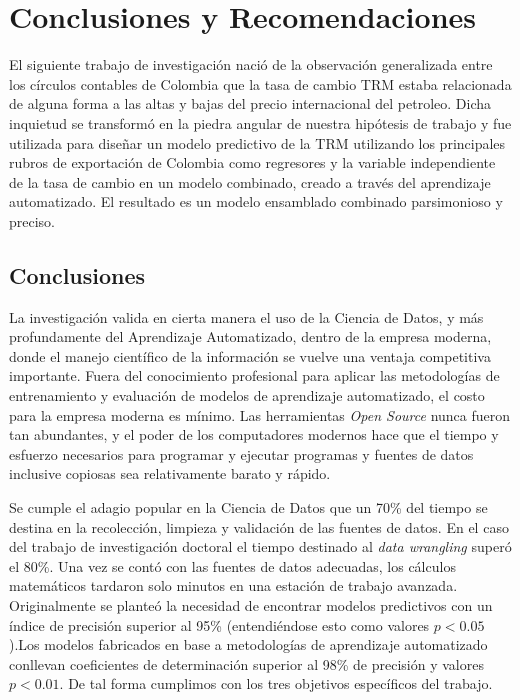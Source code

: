 \setcounter{chapter}{4}
\chapter{Conclusiones y Recomendaciones}
El siguiente trabajo de investigación nació de la observación generalizada entre los círculos contables de Colombia que la tasa de cambio TRM estaba relacionada de alguna forma a las altas y bajas del precio internacional del petroleo. Dicha inquietud se transformó en la piedra angular de nuestra hipótesis de trabajo y fue utilizada para diseñar un modelo predictivo de la TRM utilizando los principales rubros de exportación de Colombia como regresores y la variable independiente de la tasa de cambio en un modelo combinado, creado a través del aprendizaje automatizado. El resultado es un modelo ensamblado combinado parsimonioso y preciso.

\section{Conclusiones}
La investigación valida en cierta manera el uso de la Ciencia de Datos, y más profundamente del Aprendizaje Automatizado, dentro de la empresa moderna, donde el manejo científico de la información se vuelve una ventaja competitiva importante. Fuera del conocimiento profesional para aplicar las metodologías de entrenamiento y evaluación de modelos de aprendizaje automatizado, el costo para la empresa moderna es mínimo. Las herramientas \emph{Open Source} nunca fueron tan abundantes, y el poder de los computadores modernos hace que el tiempo y esfuerzo necesarios para programar y ejecutar programas y fuentes de datos inclusive copiosas sea relativamente barato y rápido.

Se cumple el adagio popular en la Ciencia de Datos que un 70\% del tiempo se destina en la recolección, limpieza y validación de las fuentes de datos. En el caso del trabajo de investigación doctoral el tiempo destinado al \emph{data wrangling} superó el 80\%. Una vez se contó con las fuentes de datos adecuadas, los cálculos matemáticos tardaron solo minutos en una estación de trabajo avanzada. Originalmente se planteó la necesidad de encontrar modelos predictivos con un índice de precisión superior al 95\% (entendiéndose esto como valores $p < 0.05$).Los modelos fabricados en base a metodologías de aprendizaje automatizado conllevan coeficientes de determinación superior al 98\% de precisión y valores $p < 0.01$. De tal forma cumplimos con los tres objetivos específicos del trabajo.

